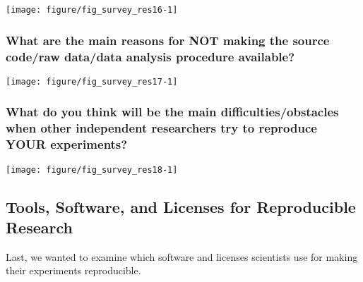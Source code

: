 \documentclass{article}\usepackage[]{graphicx}\usepackage[]{color}
\newenvironment{knitrout}{}{}
\begin{document}
\begin{knitrout}
\color{fgcolor}

{\centering \texttt{[image: figure/fig\_survey\_res16-1]} 

}



\end{knitrout}






\subsubsection{What are the main reasons for NOT making the source code/raw data/data analysis procedure available?}

\begin{knitrout}
\color{fgcolor}

{\centering \texttt{[image: figure/fig\_survey\_res17-1]} 

}



\end{knitrout}

\newpage


\subsubsection{What do you think will be the main difficulties/obstacles when other independent researchers try to reproduce YOUR experiments?}

\begin{knitrout}
\color{fgcolor}

{\centering \texttt{[image: figure/fig\_survey\_res18-1]} 

}



\end{knitrout}



\subsection{Tools, Software, and Licenses for Reproducible Research}
\label{sec:tools}

 
Last, we wanted to examine which software and licenses scientists use
for making their experiments reproducible.
\end{document}

